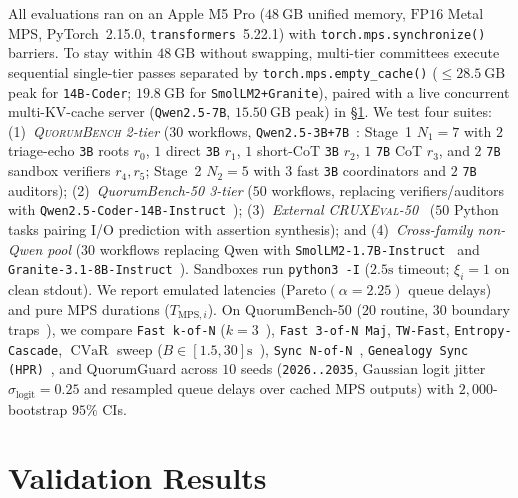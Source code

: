 \documentclass[conference]{IEEEtran}
\def\QG{QuorumGuard}%
\def\QBench{QuorumBench-50}%
\theoremstyle{definition}
\theoremstyle{remark}
\newcommand{\QG}{\textsc{QuorumGuard}}
\newcommand{\QBench}{\textsc{QuorumBench-50}}
\newcommand{\CVaR}{\operatorname{CVaR}}
\begin{document}
All evaluations ran on an Apple M5 Pro ($48~\mathrm{GB}$ unified memory, $\mathrm{FP16}$ Metal MPS, PyTorch~2.15.0, \texttt{transformers}~5.22.1) with \texttt{torch.mps.synchronize()} barriers. To stay within $48~\mathrm{GB}$ without swapping, multi-tier committees execute sequential single-tier passes separated by \texttt{torch.mps.empty\_cache()} ($\le 28.5~\mathrm{GB}$ peak for \texttt{14B-Coder}; $19.8~\mathrm{GB}$ for \texttt{SmolLM2+Granite}), paired with a live concurrent multi-KV-cache server (\texttt{Qwen2.5-7B}, $15.50~\mathrm{GB}$ peak) in \S\ref{sec:eval}. We test four suites: (1)~\emph{\textup{\textsc{QuorumBench}} 2-tier} ($30$ workflows, \texttt{Qwen2.5-3B+7B}~\cite{yang2024qwen25}: Stage~1 $N_1=7$ with $2$ triage-echo \texttt{3B} roots $r_0$, $1$ direct \texttt{3B} $r_1$, $1$ short-CoT \texttt{3B} $r_2$, $1$ \texttt{7B} CoT $r_3$, and $2$ \texttt{7B} sandbox verifiers $r_4, r_5$; Stage~2 $N_2=5$ with $3$ fast \texttt{3B} coordinators and $2$ \texttt{7B} auditors); (2)~\emph{\textup{\QBench{}} 3-tier} ($50$ workflows, replacing verifiers/auditors with \texttt{Qwen2.5-Coder-14B-Instruct}~\cite{hui2024qwen25coder}); (3)~\emph{External \textup{\textsc{CRUXEval-50}}}~\cite{gu2024cruxeval} ($50$ Python tasks pairing I/O prediction with assertion synthesis); and (4)~\emph{Cross-family non-Qwen pool} ($30$ workflows replacing Qwen with \texttt{SmolLM2-1.7B-Instruct}~\cite{allal2025smollm2} and \texttt{Granite-3.1-8B-Instruct}~\cite{granite2024team}). Sandboxes run \texttt{python3 -I} ($2.5\text{s}$ timeout; $\xi_i = 1$ on clean stdout). We report emulated latencies ($\mathrm{Pareto}(\alpha=2.25)$ queue delays) and pure MPS durations ($T_{\mathrm{MPS},i}$). On \QBench{} ($20$ routine, $30$ boundary traps~\cite{jain2025livecodebench,hendrycks2021math,cemri2025mast}), we compare \texttt{Fast k-of-N} ($k=3$~\cite{decandia2007dynamo}), \texttt{Fast 3-of-N Maj}, \texttt{TW-Fast}, \texttt{Entropy-Cascade}, $\CVaR$ sweep ($B \in [1.5, 30]\text{s}$~\cite{feng2026readiness}), \texttt{Sync N-of-N}~\cite{wang2023selfconsistency}, \texttt{Genealogy Sync (HPR)}~\cite{xie2026sparktofire,hpr2026collective}, and \QG{} across $10$ seeds (\texttt{2026..2035}, Gaussian logit jitter $\sigma_{\mathrm{logit}} = 0.25$ and resampled queue delays over cached MPS outputs) with $2{,}000$-bootstrap $95\%$ CIs.

\section{Validation Results}\label{sec:eval}
\end{document}
